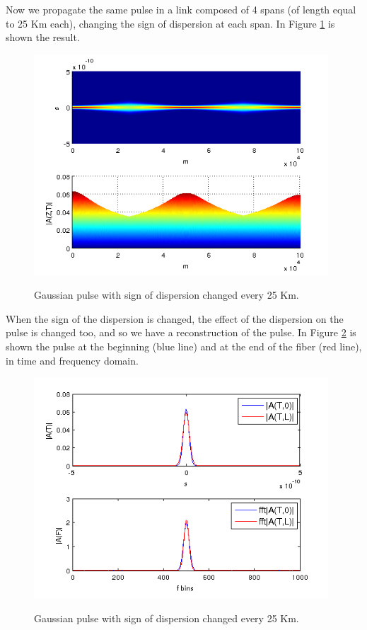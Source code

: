 \documentclass[a4paper,10pt]{report}
\begin{document}
Now we propagate the same pulse in a link composed of 4 spans (of length equal to 25 Km each), changing the sign of dispersion
at each span. In Figure \ref{es7_22} is shown the result.

\begin{figure}[!ht]
  \centering
  \includegraphics[width=11cm]{es7_22.png}\\
  \caption{Gaussian pulse with sign of dispersion changed every 25 Km.}
  \label{es7_22}
\end{figure}

When the sign of the dispersion is changed, the effect of the dispersion on the pulse is changed too, and so we have a reconstruction of the pulse.
In Figure \ref{es7_3} is shown the pulse at the beginning (blue line) and at the end of the fiber (red line), in time and frequency domain.
\begin{figure}[!ht]
  \centering
  \includegraphics[width=11cm]{es7_3.png}\\
  \caption{Gaussian pulse with sign of dispersion changed every 25 Km.}
  \label{es7_3}
\end{figure}
\end{document}
